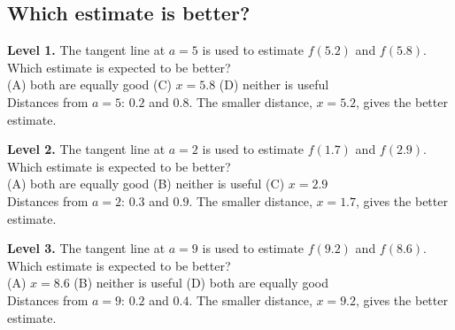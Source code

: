 \documentclass[11pt]{article}
\begin{document}
\subsection*{Which estimate is better?}
\noindent\textbf{Level 1.} The tangent line at $a=5$ is used to estimate $f(5.2)$ and $f(5.8)$. Which estimate is expected to be better?\\ (A) both are equally good \quad {} \quad (C) $x=5.8$ \quad (D) neither is useful\\  \quad Distances from $a=5$: $0.2$ and $0.8$. The smaller distance, $x=5.2$, gives the better estimate.\par\medskip
\noindent\textbf{Level 2.} The tangent line at $a=2$ is used to estimate $f(1.7)$ and $f(2.9)$. Which estimate is expected to be better?\\ (A) both are equally good \quad (B) neither is useful \quad (C) $x=2.9$ \quad {}\\  \quad Distances from $a=2$: $0.3$ and $0.9$. The smaller distance, $x=1.7$, gives the better estimate.\par\medskip
\noindent\textbf{Level 3.} The tangent line at $a=9$ is used to estimate $f(9.2)$ and $f(8.6)$. Which estimate is expected to be better?\\ (A) $x=8.6$ \quad (B) neither is useful \quad {} \quad (D) both are equally good\\  \quad Distances from $a=9$: $0.2$ and $0.4$. The smaller distance, $x=9.2$, gives the better estimate.\par\medskip
\end{document}
